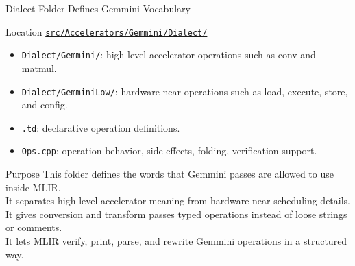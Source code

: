 \documentclass[aspectratio=169,10pt]{beamer}
\newcommand{\code}[1]{\texttt{\footnotesize #1}}
\newcommand{\repoRoot}{/home/lahcen/toolchains/onnx-mlir-xcompile/onnx-mlir}
\newcommand{\pathcode}[1]{\href{run:\repoRoot/#1}{\texttt{\scriptsize #1}}}
\begin{document}
\begin{frame}{Dialect Folder Defines Gemmini Vocabulary}
  \begin{block}{Location}
    \pathcode{src/Accelerators/Gemmini/Dialect/}
  \end{block}
  \begin{itemize}
    \item \code{Dialect/Gemmini/}: high-level accelerator operations such as conv and matmul.
    \item \code{Dialect/GemminiLow/}: hardware-near operations such as load, execute, store, and config.
    \item \code{*.td}: declarative operation definitions.
    \item \code{*Ops.cpp}: operation behavior, side effects, folding, verification support.
  \end{itemize}
  \begin{block}{Purpose}
    This folder defines the words that Gemmini passes are allowed to use inside MLIR.\\
    It separates high-level accelerator meaning from hardware-near scheduling details.\\
    It gives conversion and transform passes typed operations instead of loose strings or comments.\\
    It lets MLIR verify, print, parse, and rewrite Gemmini operations in a structured way.
  \end{block}
\end{frame}
\end{document}

